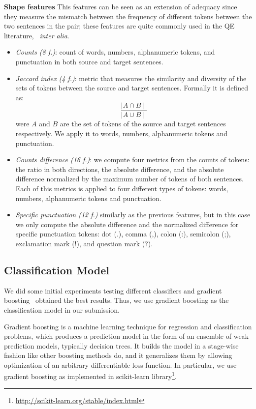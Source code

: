 \textbf{Shape features} This features can be seen as an extension of adequacy since they measure the mismatch between the frequency of different tokens between the two sentences in the pair; these features are quite commonly used in the QE literature,~\cite{specia15} \textit{inter alia}.
\begin{itemize}
\item \textit{Counts (8 f.)}: count of words, numbers, alphanumeric tokens, and punctuation in both source and target sentences.
\item \textit{Jaccard index (4 f.)}: metric that measures the similarity and diversity of the sets of tokens between the source and target sentences. Formally it is defined as:
$$ \frac{\mid A\cap B\mid}{\mid A\cup B\mid}$$
were $A$ and $B$ are the set of tokens of the source and target sentences respectively. We apply it to words, numbers, alphanumeric tokens and punctuation.
\item \textit{Counts difference (16 f.)}: we compute four metrics from the counts of tokens: the ratio in both directions, the absolute difference, and the absolute difference normalized by the maximum number of tokens of both sentences. Each of this metrics is applied to four different types of tokens: words, numbers, alphanumeric tokens and punctuation.
\item \textit{Specific punctuation (12 f.)} similarly as the previous features, but in this case we only compute the absolute difference and the normalized difference for specific punctuation tokens: dot (.), comma (,), colon (:), semicolon (;), exclamation mark (!), and question mark (?).
\end{itemize}



\subsection{Classification Model}
\label{ssec:model}

We did some initial experiments testing different classifiers and gradient boosting~\cite{Friedman02} obtained the best results. Thus, we use gradient boosting as the classification model in our submission.

Gradient boosting is a machine learning technique for regression and classification problems, which produces a prediction model in the form of an ensemble of weak prediction models, typically decision trees. It builds the model in a stage-wise fashion like other boosting methods do, and it generalizes them by allowing optimization of an arbitrary differentiable loss function. In particular, we use gradient boosting as implemented in scikit-learn library\footnote{\url{http://scikit-learn.org/stable/index.html}}.


